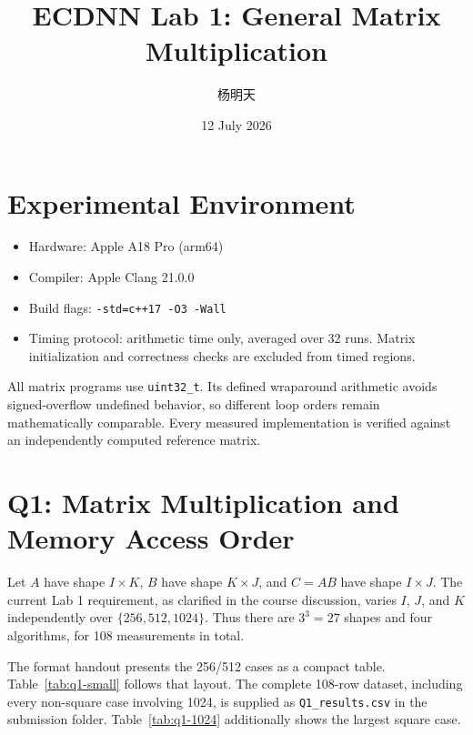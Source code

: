 \documentclass[11pt]{article}
\title{ECDNN Lab 1: General Matrix Multiplication}
\author{杨明天 \quad 2400017852}
\date{12 July 2026}
\begin{document}
\maketitle

\section{Experimental Environment}

\begin{itemize}
  \item Hardware: Apple A18 Pro (arm64)
  \item Compiler: Apple Clang 21.0.0
  \item Build flags: \texttt{-std=c++17 -O3 -Wall}
  \item Timing protocol: arithmetic time only, averaged over 32 runs. Matrix initialization and correctness checks are excluded from timed regions.
\end{itemize}

All matrix programs use \texttt{uint32\_t}. Its defined wraparound arithmetic avoids signed-overflow undefined behavior, so different loop orders remain mathematically comparable. Every measured implementation is verified against an independently computed reference matrix.

\section{Q1: Matrix Multiplication and Memory Access Order}

Let $A$ have shape $I \times K$, $B$ have shape $K \times J$, and $C = AB$ have shape $I \times J$. The current Lab 1 requirement, as clarified in the course discussion, varies $I$, $J$, and $K$ independently over $\{256, 512, 1024\}$. Thus there are $3^3 = 27$ shapes and four algorithms, for 108 measurements in total.

The format handout presents the 256/512 cases as a compact table. Table~\ref{tab:q1-small} follows that layout. The complete 108-row dataset, including every non-square case involving 1024, is supplied as \texttt{Q1\_results.csv} in the submission folder. Table~\ref{tab:q1-1024} additionally shows the largest square case.
\end{document}
